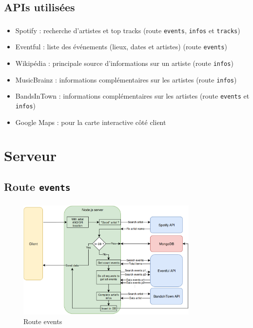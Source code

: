 \documentclass[10pt]{beamer}
\begin{document}
\subsection{APIs utilisées}
\begin{frame}
	\frametitle{\secname}
	\framesubtitle{\subsecname}
	\begin{itemize}
		\item Spotify : recherche d'artistes et top tracks (route \texttt{events}, \texttt{infos} et \texttt{tracks})
		\item Eventful : liste des événements (lieux, dates et artistes) (route \texttt{events})
		\item Wikipédia : principale source d'informations sur un artiste (route \texttt{infos})
        \item MusicBrainz : informations complémentaires sur les artistes (route \texttt{infos})
		\item BandsInTown : informations complémentaires sur les artistes (route \texttt{events} et \texttt{infos})
		\item Google Maps : pour la carte interactive côté client
	\end{itemize}
\end{frame}

\section{Serveur}
\subsection{Route \texttt{events}}
\begin{frame}
	\frametitle{\secname}
	\framesubtitle{\subsecname}
	\begin{figure}
		\begin{center}
			\includegraphics[width=0.8\textwidth]{images/events.png}
		\end{center}
		\caption{Route events}
	\end{figure}
\end{frame}
\end{document}
